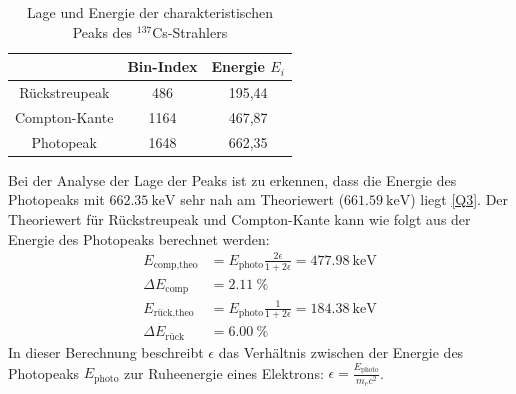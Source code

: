 \begin{table}
    \centering
    \caption{Lage und Energie der charakteristischen Peaks des $^{137}$Cs-Strahlers}
    \label{tab:Cs_peaks}
    \begin{tabular}{ c c c }
        \toprule
        & {Bin-Index} & {Energie $E_i$}      \\
        \midrule
        {Rückstreupeak} & 486  & 195,44      \\
        {Compton-Kante} & 1164 & 467,87      \\
        {Photopeak}     & 1648 & 662,35      \\
        \bottomrule
    \end{tabular}
\end{table}
\FloatBarrier
Bei der Analyse der Lage der Peaks ist zu erkennen, dass die Energie des Photopeaks mit $\SI{662,35}{\kilo \electronvolt}$ sehr nah am Theoriewert ($\SI{661,59}{\kilo \electronvolt}$) liegt \ref{Q3}.
Der Theoriewert für Rückstreupeak und Compton-Kante kann wie folgt aus der Energie des Photopeaks berechnet werden:
\begin{align*}
    E_{\text{comp,theo}} &= E_\text{photo} \frac{2\epsilon}{1+2\epsilon} = \SI{477,98}{\kilo\electronvolt} \\ \Delta E_\text{comp} &= \SI{2,11}{\percent} \\
    E_{\text{rück,theo}} &= E_\text{photo} \frac{1}{1+2\epsilon} = \SI{184,38}{\kilo\electronvolt} \\
    \Delta E_\text{rück} &= \SI{6,00}{\percent}
\end{align*}
In dieser Berechnung beschreibt $\epsilon$ das Verhältnis zwischen der Energie des Photopeaks $E_\text{photo}$ zur Ruheenergie eines Elektrons: $\epsilon = \frac{E_\text{photo}}{m_e c^2}$.

